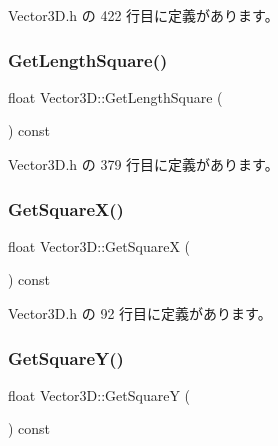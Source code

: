  Vector3\+D.\+h の 422 行目に定義があります。

\mbox{\label{class_vector3_d_a0d486a19d3f7515e2f147c78bb73ce07}} 
\subsubsection{\texorpdfstring{Get\+Length\+Square()}{GetLengthSquare()}}
{\footnotesize\ttfamily float Vector3\+D\+::\+Get\+Length\+Square (\begin{DoxyParamCaption}{ }\end{DoxyParamCaption}) const\hspace{0.3cm}{\ttfamily [inline]}}



 Vector3\+D.\+h の 379 行目に定義があります。

\mbox{\label{class_vector3_d_a77ee5fc836fd4024bd8bdae603b1677e}} 
\subsubsection{\texorpdfstring{Get\+Square\+X()}{GetSquareX()}}
{\footnotesize\ttfamily float Vector3\+D\+::\+Get\+SquareX (\begin{DoxyParamCaption}{ }\end{DoxyParamCaption}) const\hspace{0.3cm}{\ttfamily [inline]}}



 Vector3\+D.\+h の 92 行目に定義があります。

\mbox{\label{class_vector3_d_a151d4791ff98d3f99d038c1dc372e0fc}} 
\subsubsection{\texorpdfstring{Get\+Square\+Y()}{GetSquareY()}}
{\footnotesize\ttfamily float Vector3\+D\+::\+Get\+SquareY (\begin{DoxyParamCaption}{ }\end{DoxyParamCaption}) const\hspace{0.3cm}{\ttfamily [inline]}}



